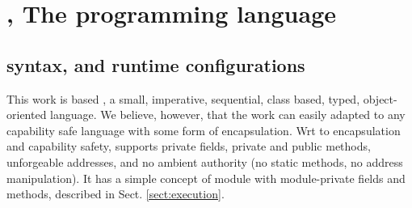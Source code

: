 \section{\LangOO, The programming language }  
\label{sect:underlying}

\subsection{\LangOO syntax, and runtime configurations}
\label{sub:Loo} 
{This work} is based \LangOO, a {small}, imperative, sequential,  class based, typed, object-oriented language. 
 {We believe, however, that the work can easily adapted to any capability safe language with some form of encapsulation. 
Wrt to encapsulation and  capability safety},  \LangOO supports private fields, private and public methods, unforgeable addresses, and no ambient authority (no static methods, no address manipulation).
 It has a simple concept of module with module-private fields and methods, described in Sect. \ref{sect:execution}.
